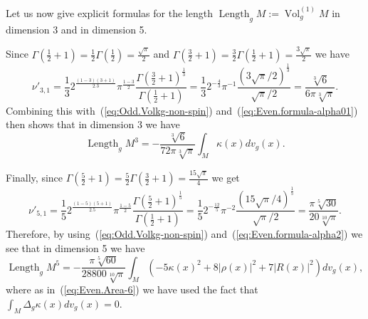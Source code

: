 \documentclass[leqno, 10pt]{amsart}
\theoremstyle{remark}
\begin{document}
Let us now give explicit formulas for the length $ {\operatorname{{Length}}}_{g}M:={{\operatorname{{Vol}}}}^{(1)}_{g}M$ in dimension 3 and in dimension 5.

Since $\Gamma(\frac{1}{2}+1)=\frac{1}{2}\Gamma(\frac{1}{2})=\frac{\sqrt{\pi} }{2}$ and 
$\Gamma(\frac{3}{2}+1)=\frac{3}{2}\Gamma(\frac{1}{2}+1)=\frac{3\sqrt{\pi}}{2}$ we have 
\begin{equation}
    \nu'_{3,1}=\frac{1}{3}2^{\frac{(1-3)(3+1)}{2.3}}\pi^{\frac{1-3}{2}}\frac{\Gamma(\frac{3}{2}+1)^{\frac{1}{3}}}{\Gamma(\frac{1}{2}+1)} 
    = \frac{1}{3}2^{-\frac{4}{3}}\pi^{-1}\frac{(3\sqrt{\pi}/2)^{\frac{1}{3}}}{\sqrt{\pi}/2}= \frac{\sqrt[3]{6}}{6\pi\sqrt[3]{\pi}}.
\end{equation}
Combining this with~(\ref{eq:Odd.Volkg-non-spin}) and~(\ref{eq:Even.formula-alpha01}) then shows that in dimension 3 we have
\begin{equation}
    {\operatorname{{Length}}}_{g}M^{3}=-\frac{\sqrt[3]{6}}{72\pi\sqrt[3]{\pi}}\int_{M}\kappa(x)dv_{g}(x).
    
\end{equation}

Finally, since $\Gamma(\frac{5}{2}+1)=\frac{5}{2}\Gamma(\frac{3}{2}+1)=\frac{15\sqrt{\pi}}{4}$ we get
\begin{equation}
     \nu'_{5,1}=\frac{1}{5}2^{\frac{(1-5)(5+1)}{2.5}}\pi^{\frac{1-5}{2}}\frac{\Gamma(\frac{5}{2}+1)^{\frac{1}{5}}}{\Gamma(\frac{1}{2}+1)} 
     = \frac{1}{5}2^{-\frac{12}{5}}\pi^{-2}\frac{(15\sqrt{\pi}/4)^{\frac{1}{5}}}{\sqrt{\pi}/2}= \frac{\pi\sqrt[5]{30}}{20\sqrt[10]{\pi}}.
 
\end{equation}
Therefore, by using~(\ref{eq:Odd.Volkg-non-spin}) and~(\ref{eq:Even.formula-alpha2}) we see that in dimension 5 we have
\begin{equation}
     {\operatorname{{Length}}}_{g}M^{5}= -\frac{\pi\sqrt[5]{60}}{28800\sqrt[10]{\pi}} \int_{M}(-5\kappa(x)^{2}+8|\rho(x)|^{2}+7|R(x)|^{2})dv_{g}(x),
\end{equation}
where as in~(\ref{eq:Even.Area-6}) we have used the fact that $\int_{M}\Delta_{g}\kappa(x) dv_{g}(x)=0$. 
 
\end{document}
